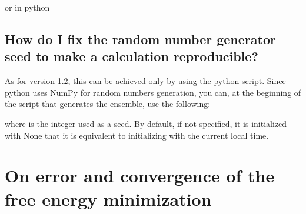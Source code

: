 \documentclass[a4paper,11pt,english]{sphinxmanual}
\begin{document}
\begin{sphinxVerbatim}[commandchars=\\\{\}]
\end{sphinxVerbatim}

\sphinxAtStartPar
or in python

\begin{sphinxVerbatim}[commandchars=\\\{\}]
  
  
  
\end{sphinxVerbatim}


\subsection{How do I fix the random number generator seed to make a calculation reproducible?}
\label{\detokenize{faq:how-do-i-fix-the-random-number-generator-seed-to-make-a-calculation-reproducible}}
\sphinxAtStartPar
As for version 1.2, this can be achieved only by using the python script.
Since python uses NumPy for random numbers generation, you can, at the beginning of the script that generates the ensemble, use the following:

\begin{sphinxVerbatim}[commandchars=\\\{\}]
   

  
  
\end{sphinxVerbatim}

\sphinxAtStartPar
where  is the integer used as a seed. By default, if not specified, it is initialized with None that it is equivalent to initializing with the current local time.


\section{On error and convergence of the free energy minimization}
\label{\detokenize{faq:on-error-and-convergence-of-the-free-energy-minimization}}
\end{document}

